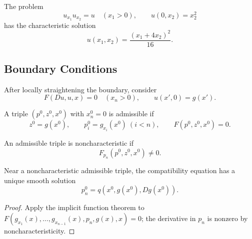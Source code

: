 \begin{example}
\label{ex:fully-nonlinear-halfspace-characteristics}

The problem
\[
u_{x_1}u_{x_2}=u\quad(x_1>0),\qquad u(0,x_2)=x_2^2
\]
has the characteristic solution
\[
u(x_1,x_2)=\frac{(x_1+4x_2)^2}{16}.
\]
\end{example}

\subsection{Boundary Conditions}
\label{sec:characteristics-boundary-conditions}

After locally straightening the boundary, consider
\[
F(Du,u,x)=0\quad(x_n>0),\qquad u(x',0)=g(x').
\]

\begin{definition}
\label{def:compatibility-conditions-admissible-triple}
A triple $(p^0,z^0,x^0)$ with $x_n^0=0$ is admissible if
\[
z^0=g(x^0),\qquad p_i^0=g_{x_i}(x^0)\ (i<n),\qquad
F(p^0,z^0,x^0)=0.
\]
\end{definition}

\begin{definition}
\label{def:noncharacteristic-triple}

An admissible triple is noncharacteristic if
\[
F_{p_n}(p^0,z^0,x^0)\ne0.
\]
\end{definition}

\begin{lemma}
\label{lem:noncharacteristic-boundary-conditions}

Near a noncharacteristic admissible triple, the compatibility equation has a
unique smooth solution
\[
p_n^0=q(x^0,g(x^0),Dg(x^0)).
\]
\end{lemma}

\begin{proof}
\sketch Apply the implicit function theorem to
$F(g_{x_1}(x),\ldots,g_{x_{n-1}}(x),p_n,g(x),x)=0$; the derivative in
$p_n$ is nonzero by noncharacteristicity.
\end{proof}

